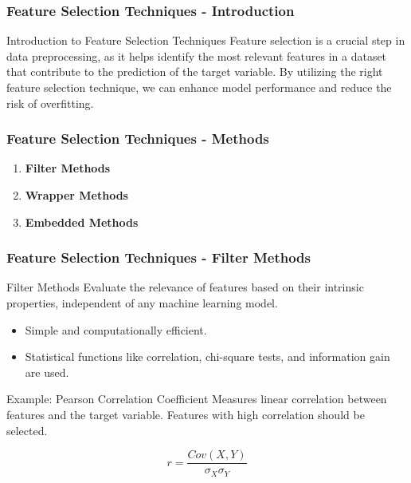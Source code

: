 \documentclass[aspectratio=169]{beamer}
\begin{document}
\begin{frame}[fragile]
    \frametitle{Feature Selection Techniques - Introduction}
    \begin{block}{Introduction to Feature Selection Techniques}
        Feature selection is a crucial step in data preprocessing, as it helps identify the most relevant features in a dataset that contribute to the prediction of the target variable. 
        By utilizing the right feature selection technique, we can enhance model performance and reduce the risk of overfitting.
    \end{block}
\end{frame}

\begin{frame}[fragile]
    \frametitle{Feature Selection Techniques - Methods}
    \begin{enumerate}
        \item \textbf{Filter Methods}
        \item \textbf{Wrapper Methods}
        \item \textbf{Embedded Methods}
    \end{enumerate}
\end{frame}

\begin{frame}[fragile]
    \frametitle{Feature Selection Techniques - Filter Methods}
    \begin{block}{Filter Methods}
        Evaluate the relevance of features based on their intrinsic properties, independent of any machine learning model.
    \end{block}
    \begin{itemize}
        \item Simple and computationally efficient.
        \item Statistical functions like correlation, chi-square tests, and information gain are used.
    \end{itemize}
    \begin{block}{Example: Pearson Correlation Coefficient}
        Measures linear correlation between features and the target variable.
        Features with high correlation should be selected.
    \end{block}
    \begin{equation}
        r = \frac{Cov(X,Y)}{\sigma_X \sigma_Y}
    \end{equation}
\end{frame}
\end{document}
